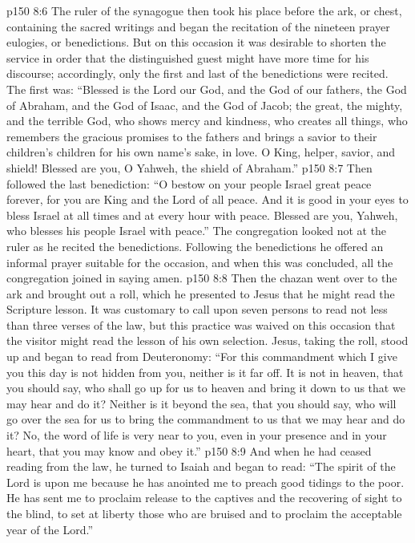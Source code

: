 \vs p150 8:6 The ruler of the synagogue then took his place before the ark, or chest, containing the sacred writings and began the recitation of the nineteen prayer eulogies, or benedictions. But on this occasion it was desirable to shorten the service in order that the distinguished guest might have more time for his discourse; accordingly, only the first and last of the benedictions were recited. The first was: “Blessed is the Lord our God, and the God of our fathers, the God of Abraham, and the God of Isaac, and the God of Jacob; the great, the mighty, and the terrible God, who shows mercy and kindness, who creates all things, who remembers the gracious promises to the fathers and brings a savior to their children’s children for his own name’s sake, in love. O King, helper, savior, and shield! Blessed are you, O Yahweh, the shield of Abraham.”
\vs p150 8:7 Then followed the last benediction: “O bestow on your people Israel great peace forever, for you are King and the Lord of all peace. And it is good in your eyes to bless Israel at all times and at every hour with peace. Blessed are you, Yahweh, who blesses his people Israel with peace.” The congregation looked not at the ruler as he recited the benedictions. Following the benedictions he offered an informal prayer suitable for the occasion, and when this was concluded, all the congregation joined in saying amen.
\vs p150 8:8 Then the chazan went over to the ark and brought out a roll, which he presented to Jesus that he might read the Scripture lesson. It was customary to call upon seven persons to read not less than three verses of the law, but this practice was waived on this occasion that the visitor might read the lesson of his own selection. Jesus, taking the roll, stood up and began to read from Deuteronomy: \textcolor{ubdarkred}{“For this commandment which I give you this day is not hidden from you, neither is it far off. It is not in heaven, that you should say, who shall go up for us to heaven and bring it down to us that we may hear and do it? Neither is it beyond the sea, that you should say, who will go over the sea for us to bring the commandment to us that we may hear and do it? No, the word of life is very near to you, even in your presence and in your heart, that you may know and obey it.”}
\vs p150 8:9 And when he had ceased reading from the law, he turned to Isaiah and began to read: \textcolor{ubdarkred}{“The spirit of the Lord is upon me because he has anointed me to preach good tidings to the poor. He has sent me to proclaim release to the captives and the recovering of sight to the blind, to set at liberty those who are bruised and to proclaim the acceptable year of the Lord.”}
